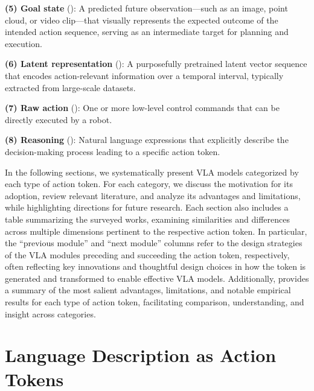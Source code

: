 \documentclass[10pt, a4paper, logo, copyright]{googledeepmind} %
\begin{document}
\noindent\textbf{(5) Goal state} (): A predicted future observation---such as an image, point cloud, or video clip---that visually represents the expected outcome of the intended action sequence, serving as an intermediate target for planning and execution.

\noindent\textbf{(6) Latent representation} (): A purposefully pretrained latent vector sequence that encodes action-relevant information over a temporal interval, typically extracted from large-scale datasets.

\noindent\textbf{(7) Raw action} (): One or more low-level control commands that can be directly executed by a robot.

\noindent\textbf{(8) Reasoning} (): Natural language expressions that explicitly describe the decision-making process leading to a specific action token.
\vspace{0.5em}

In the following sections, we systematically present VLA models categorized by each type of action token. For each category, we discuss the motivation for its adoption, review relevant literature, and analyze its advantages and limitations, while highlighting directions for future research. Each section also includes a table summarizing the surveyed works, examining similarities and differences across multiple dimensions pertinent to the respective action token. In particular, the ``previous module'' and ``next module'' columns refer to the design strategies of the VLA modules preceding and succeeding the action token, respectively, often reflecting key innovations and thoughtful design choices in how the token is generated and transformed to enable effective VLA models. Additionally,  provides a summary of the most salient advantages, limitations, and notable empirical results for each type of action token, facilitating comparison, understanding, and insight across categories.


\section{Language Description as Action Tokens}
\label{sec:language-description}


\end{document}
